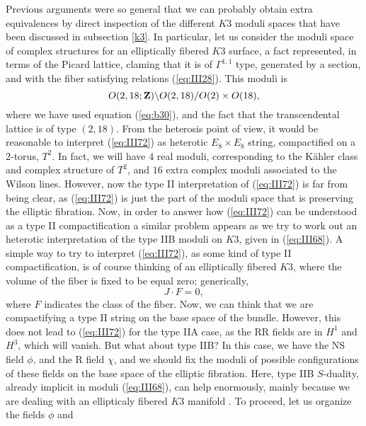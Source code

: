 Previous arguments were so general that we can probably obtain
extra equivalences by direct inspection of the different $K3$
moduli spaces that have been discussed in subsection \ref{k3}. In
particular, let us consider the moduli space of complex
structures for an elliptically fibered $K3$ surface, a fact
represented, in terms of the Picard lattice, claming that it is
of $\Gamma^{1,1}$ type, generated by a section, and with the fiber
satisfying relations (\ref{eq:III28}). This moduli is
\begin{equation}
O(2,18;{\bf Z}) \backslash O(2,18) / O(2) \times O(18),
\label{eq:III72}
\end{equation}
where we have used equation (\ref{eq:b30}), and the fact that the
transcendental lattice is of type $(2,18)$. From the heterosis
point of view, it would be reasonable to interpret
(\ref{eq:III72}) as heterotic $E_8 \times E_8$ string,
compactified on a $2$-torus, $T^2$. In fact, we will have $4$
real moduli, corresponding to the K\"ahler class and complex
structure of $T^2$, and $16$ extra complex moduli associated to
the Wilson lines. However, now the type II interpretation of
(\ref{eq:III72}) is far from being clear, as (\ref{eq:III72}) is
just the part of the moduli space that is preserving the elliptic
fibration. Now, in order to answer how (\ref{eq:III72}) can be
understood as a type II compactification a similar problem
appears as we try to work out an heterotic interpretation of the
type IIB moduli on $K3$, given in (\ref{eq:III68}). A simple way
to try to interpret (\ref{eq:III72}), as some kind of type II
compactification, is of course thinking of an elliptically
fibered $K3$, where the volume of the fiber is fixed to be equal
zero; generically,
\begin{equation}
J \cdot F=0,
\label{eq:III73b}
\end{equation}
where $F$ indicates the class of the fiber. Now, we can think
that we are compactifying a type II string on the base space of
the bundle. However, this does not lead to (\ref{eq:III72}) for
the type IIA case, as the RR fields are in $H^1$ and $H^3$, which
will vanish. But what about type IIB? In this case, we have the
NS field $\phi$, and the R field $\chi$, and we should fix the
moduli of possible configurations of these fields on the base
space of the elliptic fibration. Here, type IIB $S$-duality,
already implicit in moduli (\ref{eq:III68}), can help enormously,
mainly because we are dealing with an ellipticaly fibered $K3$
manifold \cite{As,Louis,Klemm}. To proceed, let us organize the fields $\phi$ and
